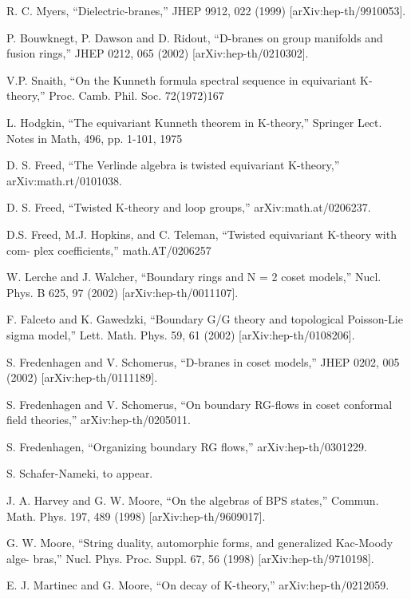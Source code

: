 \documentclass[11pt,a4paper]{ctexart}
\begin{document}
\begin{enumerate}[label={[\arabic*]},leftmargin=*,itemsep=2pt]
\item R. C. Myers, “Dielectric-branes,” JHEP 9912, 022 (1999) [arXiv:hep-th/9910053].
\item P. Bouwknegt, P. Dawson and D. Ridout, “D-branes on group manifolds and fusion rings,” JHEP 0212, 065 (2002) [arXiv:hep-th/0210302].
\item V.P. Snaith, “On the Kunneth formula spectral sequence in equivariant K-theory,” Proc. Camb. Phil. Soc. 72(1972)167
\item L. Hodgkin, “The equivariant Kunneth theorem in K-theory,” Springer Lect. Notes in Math, 496, pp. 1-101, 1975
\item D. S. Freed, “The Verlinde algebra is twisted equivariant K-theory,” arXiv:math.rt/0101038.
\item D. S. Freed, “Twisted K-theory and loop groups,” arXiv:math.at/0206237.
\item D.S. Freed, M.J. Hopkins, and C. Teleman, “Twisted equivariant K-theory with com- plex coefficients,” math.AT/0206257
\item W. Lerche and J. Walcher, “Boundary rings and N = 2 coset models,” Nucl. Phys. B 625, 97 (2002) [arXiv:hep-th/0011107].
\item F. Falceto and K. Gawedzki, “Boundary G/G theory and topological Poisson-Lie sigma model,” Lett. Math. Phys. 59, 61 (2002) [arXiv:hep-th/0108206].
\item S. Fredenhagen and V. Schomerus, “D-branes in coset models,” JHEP 0202, 005 (2002) [arXiv:hep-th/0111189].
\item S. Fredenhagen and V. Schomerus, “On boundary RG-flows in coset conformal field theories,” arXiv:hep-th/0205011.
\item S. Fredenhagen, “Organizing boundary RG flows,” arXiv:hep-th/0301229.
\item S. Schafer-Nameki, to appear.
\item J. A. Harvey and G. W. Moore, “On the algebras of BPS states,” Commun. Math. Phys. 197, 489 (1998) [arXiv:hep-th/9609017].
\item G. W. Moore, “String duality, automorphic forms, and generalized Kac-Moody alge- bras,” Nucl. Phys. Proc. Suppl. 67, 56 (1998) [arXiv:hep-th/9710198].
\item E. J. Martinec and G. Moore, “On decay of K-theory,” arXiv:hep-th/0212059.
\end{enumerate}
\end{document}
